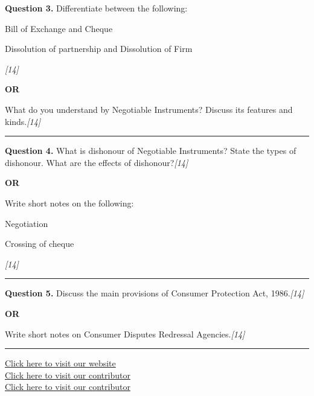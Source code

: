 \documentclass[11pt,a4paper]{article}
\newcommand{\pts}[1]{\hfill   \textit{[#1]}}
\begin{document}
\noindent   \textbf{Question 3.}
Differentiate between the following:

\begin{parts}
  \item Bill of Exchange and Cheque
  \item Dissolution of partnership and Dissolution of Firm
\end{parts}\pts{14}

\centerline{   \textbf{OR}}

What do you understand by Negotiable Instruments? Discuss its features and kinds.\pts{14}

\medskip\rule{\linewidth}{0.2pt}




\noindent   \textbf{Question 4.}
What is dishonour of Negotiable Instruments? State the types of dishonour. What are the effects of dishonour?\pts{14}

\centerline{   \textbf{OR}}

Write short notes on the following:

\begin{parts}
  \item Negotiation
  \item Crossing of cheque
\end{parts}\pts{14}

\medskip\rule{\linewidth}{0.2pt}




\noindent   \textbf{Question 5.}
Discuss the main provisions of Consumer Protection Act, 1986.\pts{14}

\centerline{   \textbf{OR}}

Write short notes on Consumer Disputes Redressal Agencies.\pts{14}

\vfill
\rule{\linewidth}{0.4pt}

\begin{center}\small
\href{https://bhu-exam.vercel.app/}{Click here to visit our website}\\[4pt]
\href{https://me-aryan.vercel.app/}{Click here to visit our contributor}\\[4pt]
\href{https://quashan-me.vercel.app/}{Click here to visit our contributor}
\end{center}
\end{document}
